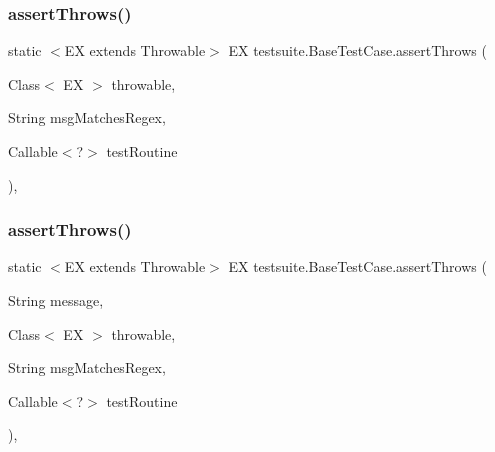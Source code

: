 \subsubsection{\texorpdfstring{assert\+Throws()}{assertThrows()}\hspace{0.1cm}{\footnotesize\ttfamily [3/4]}}
{\footnotesize\ttfamily static $<$EX extends Throwable$>$ EX testsuite.\+Base\+Test\+Case.\+assert\+Throws (\begin{DoxyParamCaption}\item[{Class$<$ EX $>$}]{throwable,  }\item[{String}]{msg\+Matches\+Regex,  }\item[{Callable$<$?$>$}]{test\+Routine }\end{DoxyParamCaption})\hspace{0.3cm}{\ttfamily [static]}, {\ttfamily [protected]}}

\mbox{\label{classtestsuite_1_1_base_test_case_a933e368e79298cfda4960166ec2b078c}} 
\subsubsection{\texorpdfstring{assert\+Throws()}{assertThrows()}\hspace{0.1cm}{\footnotesize\ttfamily [4/4]}}
{\footnotesize\ttfamily static $<$EX extends Throwable$>$ EX testsuite.\+Base\+Test\+Case.\+assert\+Throws (\begin{DoxyParamCaption}\item[{String}]{message,  }\item[{Class$<$ EX $>$}]{throwable,  }\item[{String}]{msg\+Matches\+Regex,  }\item[{Callable$<$?$>$}]{test\+Routine }\end{DoxyParamCaption})\hspace{0.3cm}{\ttfamily [static]}, {\ttfamily [protected]}}

\mbox{\label{classtestsuite_1_1_base_test_case_a604f630b7961dd73826ab5416a076ec7}} 
